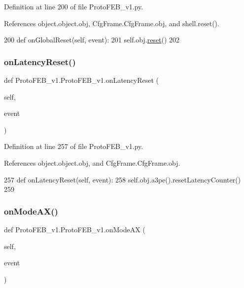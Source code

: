 Definition at line 200 of file Proto\+F\+E\+B\+\_\+v1.\+py.



References object.\+object.\+obj, Cfg\+Frame.\+Cfg\+Frame.\+obj, and shell.\+reset().


\begin{DoxyCode}
200     \textcolor{keyword}{def }onGlobalReset(self, event):
201         self.obj.\hyperlink{namespaceshell_a2f31bbe4baf894f4863c4d392239ab8b}{reset}()
202 
\end{DoxyCode}
\mbox{\label{classProtoFEB__v1_1_1ProtoFEB__v1_a243c7ced24005de9ce61efac1db46564}} 
\subsubsection{\texorpdfstring{on\+Latency\+Reset()}{onLatencyReset()}}
{\footnotesize\ttfamily def Proto\+F\+E\+B\+\_\+v1.\+Proto\+F\+E\+B\+\_\+v1.\+on\+Latency\+Reset (\begin{DoxyParamCaption}\item[{}]{self,  }\item[{}]{event }\end{DoxyParamCaption})}



Definition at line 257 of file Proto\+F\+E\+B\+\_\+v1.\+py.



References object.\+object.\+obj, and Cfg\+Frame.\+Cfg\+Frame.\+obj.


\begin{DoxyCode}
257     \textcolor{keyword}{def }onLatencyReset(self, event):
258         self.obj.a3pe().resetLatencyCounter()
259 
\end{DoxyCode}
\mbox{\label{classProtoFEB__v1_1_1ProtoFEB__v1_ab6385041b979fc82b051649c486a0d13}} 
\subsubsection{\texorpdfstring{on\+Mode\+A\+X()}{onModeAX()}}
{\footnotesize\ttfamily def Proto\+F\+E\+B\+\_\+v1.\+Proto\+F\+E\+B\+\_\+v1.\+on\+Mode\+AX (\begin{DoxyParamCaption}\item[{}]{self,  }\item[{}]{event }\end{DoxyParamCaption})}



